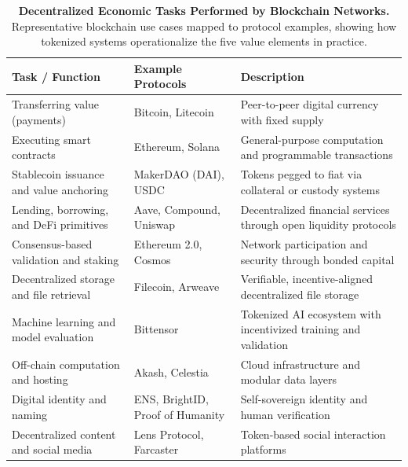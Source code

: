 \documentclass[12pt]{article}
\begin{document}
\begin{table}[H]
\centering
\caption{\textbf{Decentralized Economic Tasks Performed by Blockchain Networks.} 
Representative blockchain use cases mapped to protocol examples, showing how tokenized systems operationalize the five value elements in practice.}
\label{tab:blockchain_tasks}
\renewcommand{\arraystretch}{1.4}
\begin{tabular}{@{}>{\raggedright\arraybackslash}p{5.2cm} >{\raggedright\arraybackslash}p{4.8cm} L{5.5cm}@{}}
\toprule
{}
\textbf{Task / Function} & \textbf{Example Protocols} & \textbf{Description} \\
\midrule
Transferring value (payments) & Bitcoin, Litecoin & Peer-to-peer digital currency with fixed supply \citep{nakamoto2008bitcoin, gans2019economics} \\
Executing smart contracts & Ethereum, Solana & General-purpose computation and programmable transactions \citep{buterin2022proof, cong2021tokenomics} \\
Stablecoin issuance and value anchoring & MakerDAO (DAI), USDC & Tokens pegged to fiat via collateral or custody systems \citep{klages2020stablecoins2, schar2021defi} \\
Lending, borrowing, and DeFi primitives & Aave, Compound, Uniswap & Decentralized financial services through open liquidity protocols \citep{schar2021defi} \\
Consensus-based validation and staking & Ethereum 2.0, Cosmos & Network participation and security through bonded capital \citep{saleh2021blockchain} \\
Decentralized storage and file retrieval & Filecoin, Arweave & Verifiable, incentive-aligned decentralized file storage \citep{catalini2020some} \\
Machine learning and model evaluation & Bittensor & Tokenized AI ecosystem with incentivized training and validation \citep{rao2023bittensor} \\
Off-chain computation and hosting & Akash, Celestia & Cloud infrastructure and modular data layers \citep{gangwal2023survey} \\
Digital identity and naming & ENS, BrightID, Proof of Humanity & Self-sovereign identity and human verification \citep{bonneau2015sok} \\
Decentralized content and social media & Lens Protocol, Farcaster & Token-based social interaction platforms \citep{singh2023blockchain} \\
\bottomrule
\end{tabular}
\end{table}
\end{document}
